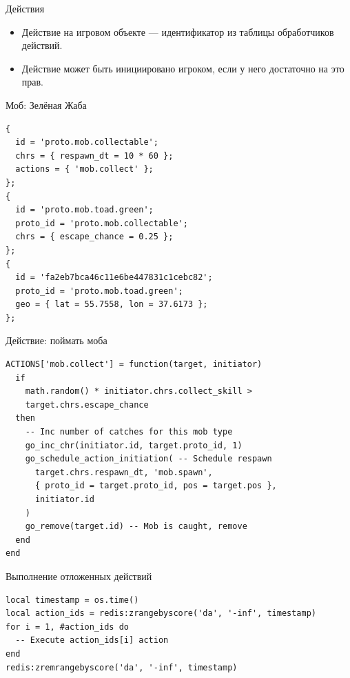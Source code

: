 \documentclass[aspectratio=169,handout,bigger]{beamer}
\begin{document}
\begin{frame}{Действия}
  \begin{itemize}
    \item Действие на игровом объекте --- идентификатор из таблицы
          обработчиков действий.
    \item Действие может быть инициировано игроком,
          если у него достаточно на это прав.
  \end{itemize}
\end{frame}


\begin{frame}[fragile]{Моб: Зелёная Жаба}
\begin{verbatim}
{
  id = 'proto.mob.collectable';
  chrs = { respawn_dt = 10 * 60 };
  actions = { 'mob.collect' };
};
{
  id = 'proto.mob.toad.green';
  proto_id = 'proto.mob.collectable';
  chrs = { escape_chance = 0.25 };
};
{
  id = 'fa2eb7bca46c11e6be447831c1cebc82';
  proto_id = 'proto.mob.toad.green';
  geo = { lat = 55.7558, lon = 37.6173 };
};
\end{verbatim}
\end{frame}


\begin{frame}[fragile]{Действие: поймать моба}
\begin{verbatim}
ACTIONS['mob.collect'] = function(target, initiator)
  if
    math.random() * initiator.chrs.collect_skill >
    target.chrs.escape_chance
  then
    -- Inc number of catches for this mob type
    go_inc_chr(initiator.id, target.proto_id, 1)
    go_schedule_action_initiation( -- Schedule respawn
      target.chrs.respawn_dt, 'mob.spawn',
      { proto_id = target.proto_id, pos = target.pos },
      initiator.id
    )
    go_remove(target.id) -- Mob is caught, remove
  end
end
\end{verbatim}
\end{frame}


\begin{frame}[fragile]{Выполнение отложенных действий}
\begin{verbatim}
local timestamp = os.time()
local action_ids = redis:zrangebyscore('da', '-inf', timestamp)
for i = 1, #action_ids do
  -- Execute action_ids[i] action
end
redis:zremrangebyscore('da', '-inf', timestamp)
\end{verbatim}
\end{frame}
\end{document}
